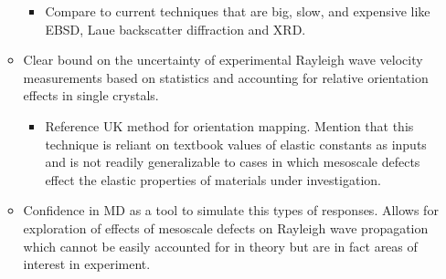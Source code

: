 \begin{itemize}
\begin{itemize}
 		\begin{itemize}
 		\item Compare to current techniques that are big, slow, and expensive like EBSD, Laue backscatter diffraction and XRD.
 		\end{itemize}
 	\item Clear bound on the uncertainty of experimental Rayleigh wave velocity measurements based on statistics and accounting for relative orientation effects in single crystals.
 		\begin{itemize}
 		\item Reference UK method for orientation mapping. Mention that this technique is reliant on textbook values of elastic constants as inputs and is not readily generalizable to cases in which mesoscale defects effect the elastic properties of materials under investigation.
 		\end{itemize}
 	\item Confidence in MD as a tool to simulate this types of responses. Allows for exploration of effects of mesoscale defects on Rayleigh wave propagation which cannot be easily accounted for in theory but are in fact areas of interest in experiment.
 	\end{itemize}
\end{itemize}





